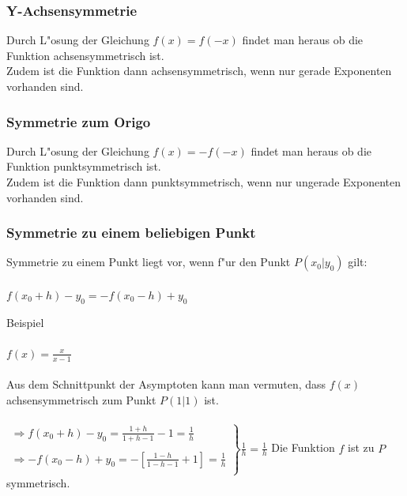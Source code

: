 \subsubsection{Y-Achsensymmetrie}

Durch L"osung der Gleichung $f(x)=f(-x)$ findet man heraus ob die Funktion achsensymmetrisch ist.\\
Zudem ist die Funktion dann achsensymmetrisch, wenn nur gerade Exponenten vorhanden sind.\\

\subsubsection{Symmetrie zum Origo}

Durch L"osung der Gleichung $f(x)=-f(-x)$ findet man heraus ob die Funktion punktsymmetrisch ist.\\
Zudem ist die Funktion dann punktsymmetrisch, wenn nur ungerade Exponenten vorhanden sind.\\


\subsubsection{Symmetrie zu einem beliebigen Punkt}

Symmetrie zu einem Punkt liegt vor, wenn f"ur den Punkt $P(x_{0}|y_{0})$ gilt:\\
\\
$f(x_{0}+h)-y_{0}=-f(x_{0}-h)+y_{0}$

\begin{Bemerkung}
Beispiel\\
\\
$f(x)=\frac{x}{x-1}$\\
\\
Aus dem Schnittpunkt der Asymptoten kann man vermuten, dass $f(x)$ achsensymmetrisch zum Punkt $P(1|1)$ ist.\\
\\
$\left. \begin{array}{rcl}
\Rightarrow f(x_{0}+h)-y_{0}=\frac{1+h}{1+h-1}-1=\frac{1}{h}\\
\\
\Rightarrow -f(x_{0}-h)+y_{0}=-[\frac{1-h}{1-h-1}+1]=\frac{1}{h}\\
\end{array}\right\} \frac{1}{h}=\frac{1}{h}$ Die Funktion $f$ ist zu $P$ symmetrisch.\\
\end{Bemerkung}


